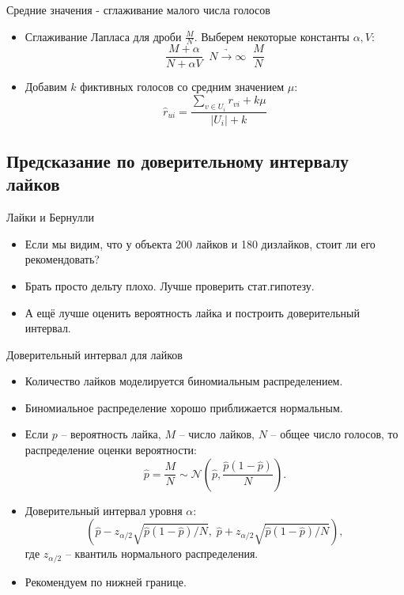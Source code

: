 \documentclass[9pt]{beamer}
\begin{document}
\begin{frame}{Средние значения - сглаживание малого числа голосов}
    \begin{itemize}
        \item Сглаживание Лапласа для дроби \(\frac{M}{N}\). Выберем некоторые константы \(\alpha, V\):
        $$\frac{M + \alpha}{N + \alpha V}\;\;\underrightarrow{N\rightarrow \infty}\;\;\frac{M}{N}$$
        \item Добавим \(k\) фиктивных голосов со средним значением \(\mu\):
        $$\hat r_{ui} = \frac{\sum\limits_{v\in U_i} r_{vi} + k\mu}{|U_i| + k}$$
    \end{itemize}
\end{frame}

\subsection{Предсказание по доверительному интервалу лайков}

\begin{frame}{Лайки и Бернулли}
\begin{itemize}
    \item Если мы видим, что у объекта 200 лайков и 180 дизлайков, стоит ли его рекомендовать?
    \item Брать просто дельту плохо. Лучше проверить стат.гипотезу.
    \item А ещё лучше оценить вероятность лайка и построить доверительный интервал.
\end{itemize}
\end{frame}

\begin{frame}{Доверительный интервал для лайков}
\begin{itemize}
    \item Количество лайков моделируется биномиальным распределением.
    \item Биномиальное распределение хорошо приближается нормальным.
    \item Если $p$ – вероятность лайка, $M$ – число лайков, $N$ – общее число голосов,  то распределение оценки вероятности:
    $$\hat p = \frac{M}{N} \sim \mathcal{N}\left(\hat p, \frac{\hat p(1-\hat p)}{N}\right).$$
    \item Доверительный интервал уровня $\alpha$:
    $$\left(\hat p - z_{\alpha /2} \sqrt{\hat p(1-\hat p)/N},\;\hat p + z_{\alpha/2}\sqrt{\hat p(1-\hat p)/N}\right),$$
    где $z_{\alpha/2}$ – квантиль нормального распределения.
    \item Рекомендуем по нижней границе.
\end{itemize}
\end{frame}
\end{document}
